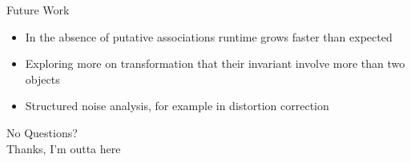 \documentclass{beamer}
\begin{document}
\begin{frame}{Future Work}
  \begin{itemize}
    \item<1-> In the absence of putative associations runtime grows faster than expected
    \item<2-> Exploring more on transformation that their invariant involve more than two objects
    \item<3-> Structured noise analysis, for example in distortion correction 
  \end{itemize}
\end{frame}



\begin{frame}{}
  \begin{center}
    \Huge No Questions?\\[2cm]

    \huge Thanks, I'm outta here
  \end{center}
\end{frame}
\end{document}
